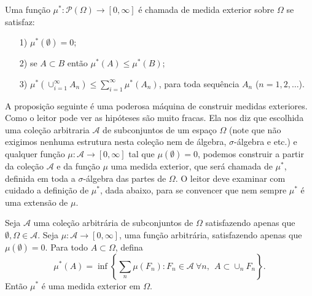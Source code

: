 \begin{definicao}
\label{definicao-medida-exterior}
	Uma função $\mu^*:\mathcal{P}(\Omega)\to [0,\infty]$ é chamada de medida exterior 
	sobre $\Omega$ se satisfaz:
	\begin{itemize}
		\item[1)] $\mu^*(\emptyset)=0$;
		\item[2)] se $A\subset B$ então $\mu^*(A)\leq \mu^*(B)$;
		\item[3)] $\mu^{*}(\cup_{i=1}^{\infty} A_n) \leq \sum_{i=1}^{\infty} \mu^{*}(A_n)$, para toda
					sequência $A_n$ ($n=1,2,\ldots$).
	\end{itemize}
\end{definicao}






A proposição seguinte é uma poderosa máquina de construir medidas exteriores.
Como o leitor pode ver as hipóteses são muito fracas. Ela nos diz que
escolhida uma coleção arbitraria $\mathcal{A}$ de subconjuntos
de um espaço $\Omega$ 
(note que não exigimos nenhuma estrutura nesta coleção nem de álgebra, $\sigma$-álgebra e etc.)
e qualquer função $\mu:\mathcal{A}\to [0,\infty]$  
tal que $\mu(\emptyset)=0$, podemos construir a partir da coleção $\mathcal{A}$ e
da função $\mu$ uma medida exterior, que será chamada de $\mu^{*}$,
definida em toda a $\sigma$-álgebra das partes de $\Omega$.
O leitor deve examinar com cuidado a definição de
$\mu^{*}$, dada abaixo, para se convencer que nem sempre $\mu^{*}$ 
é uma extensão de $\mu$. 

 
\begin{proposicao}\label{prop-med-ext}
Seja $\mathcal{A}$ uma coleção arbitrária de subconjuntos de $\Omega$ satisfazendo
apenas que $\emptyset,\Omega\in \mathcal{A}$. Seja $\mu:\mathcal{A}\to [0,\infty]$,
uma função arbitrária, satisfazendo apenas que $\mu(\emptyset)=0$.
Para todo $A\subset \Omega$, defina
\begin{equation}\label{def-medida-exterior}
\mu^{*}(A)= 
\inf \left\{
	\sum_{n}\mu(F_n): F_n\in \mathcal{A} \ \forall n,\ \ A\subset \cup_{n} F_n
\right\}.
\end{equation}
Então $\mu^{*}$ é uma medida exterior em $\Omega$.
\end{proposicao}



